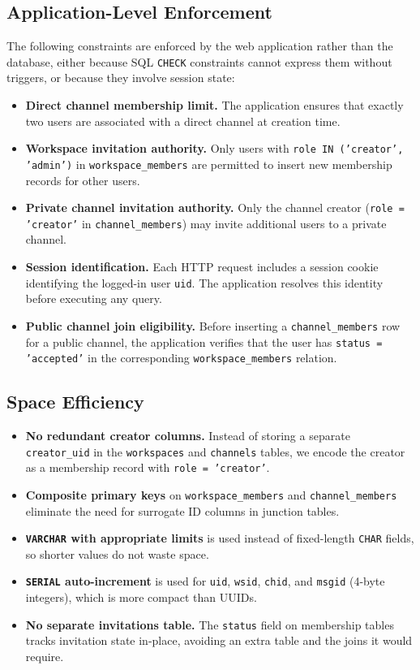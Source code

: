\documentclass[11pt]{article}
\begin{document}
\subsection{Application-Level Enforcement}

The following constraints are enforced by the web application rather than the database, either because SQL \texttt{CHECK} constraints cannot express them without triggers, or because they involve session state:

\begin{itemize}
\item \textbf{Direct channel membership limit.} The application ensures that exactly two users are associated with a direct channel at creation time.
\item \textbf{Workspace invitation authority.} Only users with \texttt{role IN ('creator', 'admin')} in \texttt{workspace\_members} are permitted to insert new membership records for other users.
\item \textbf{Private channel invitation authority.} Only the channel creator (\texttt{role = 'creator'} in \texttt{channel\_members}) may invite additional users to a private channel.
\item \textbf{Session identification.} Each HTTP request includes a session cookie identifying the logged-in user \texttt{uid}. The application resolves this identity before executing any query.
\item \textbf{Public channel join eligibility.} Before inserting a \texttt{channel\_members} row for a public channel, the application verifies that the user has \texttt{status = 'accepted'} in the corresponding \texttt{workspace\_members} relation.
\end{itemize}


\subsection{Space Efficiency}

\begin{itemize}
    \item \textbf{No redundant creator columns.} Instead of storing a separate \texttt{creator\_uid} in the \texttt{workspaces} and \texttt{channels} tables, we encode the creator as a membership record with \texttt{role = 'creator'}.
    \item \textbf{Composite primary keys} on \texttt{workspace\_members} and \texttt{channel\_members} eliminate the need for surrogate ID columns in junction tables.
    \item \textbf{\texttt{VARCHAR} with appropriate limits} is used instead of fixed-length \texttt{CHAR} fields, so shorter values do not waste space.
    \item \textbf{\texttt{SERIAL} auto-increment} is used for \texttt{uid}, \texttt{wsid}, \texttt{chid}, and \texttt{msgid} (4-byte integers), which is more compact than UUIDs.
    \item \textbf{No separate invitations table.} The \texttt{status} field on membership tables tracks invitation state in-place, avoiding an extra table and the joins it would require.
\end{itemize}
\end{document}
